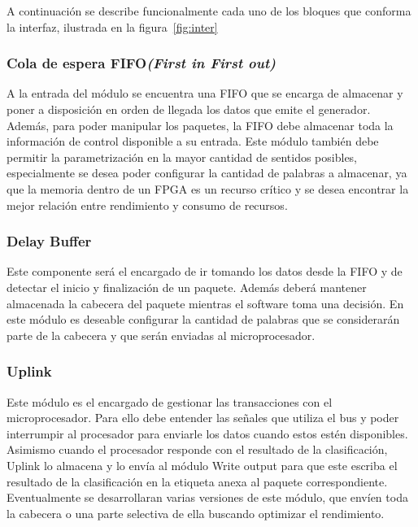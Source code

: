 
A continuación se describe funcionalmente cada uno de los bloques que conforma la interfaz, ilustrada en la figura~\ref{fig:inter}
\subsubsection{Cola de espera FIFO\textit{(First in First out)}}
A la entrada del módulo se encuentra una FIFO que se encarga de almacenar y poner a disposición en orden de llegada los datos que emite el generador. Además, para poder manipular los paquetes, la FIFO debe almacenar toda la información de control disponible a su entrada.
Este módulo también debe permitir la parametrización en la mayor cantidad de sentidos posibles, especialmente se desea poder configurar la cantidad de palabras a almacenar, ya que la memoria dentro de un FPGA es un recurso crítico y se desea encontrar la mejor relación entre rendimiento y consumo de recursos.

\subsubsection{Delay Buffer}
Este componente será el encargado de ir tomando los datos desde la FIFO y de detectar el inicio y finalización de un paquete. Además deberá mantener almacenada la cabecera del paquete mientras el software toma una decisión. En este módulo es deseable configurar la cantidad de palabras que se considerarán parte de la cabecera y que serán enviadas al microprocesador.

\subsubsection{Uplink}
Este módulo es el encargado de gestionar las transacciones con el microprocesador. Para ello debe entender las señales que utiliza el bus y poder interrumpir al procesador para enviarle los datos cuando estos estén disponibles. Asimismo cuando el procesador responde con el resultado de la clasificación, Uplink lo almacena y lo envía al módulo Write output para que este escriba el resultado de la clasificación en la etiqueta anexa al paquete correspondiente.
Eventualmente se desarrollaran varias versiones de este módulo, que envíen toda la cabecera o una parte selectiva de ella buscando optimizar el rendimiento.

